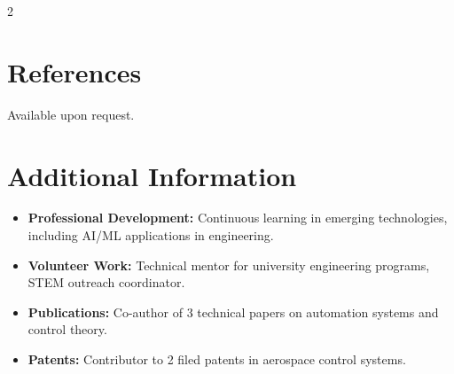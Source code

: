 \documentclass[
    language=english,
    doctype=cv,
    institution=none,
    titlestyle=simple
]{../../omnilatex}
\begin{document}
\begin{multicols}{2}
    \section{References}
    Available upon request.

    \newpage

    \section{Additional Information}
    \begin{itemize}
        \item \textbf{Professional Development:} Continuous learning in emerging technologies, including AI/ML applications in engineering.
        \item \textbf{Volunteer Work:} Technical mentor for university engineering programs, STEM outreach coordinator.
        \item \textbf{Publications:} Co-author of 3 technical papers on automation systems and control theory.
        \item \textbf{Patents:} Contributor to 2 filed patents in aerospace control systems.
    \end{itemize}

\end{multicols}
\end{document}
